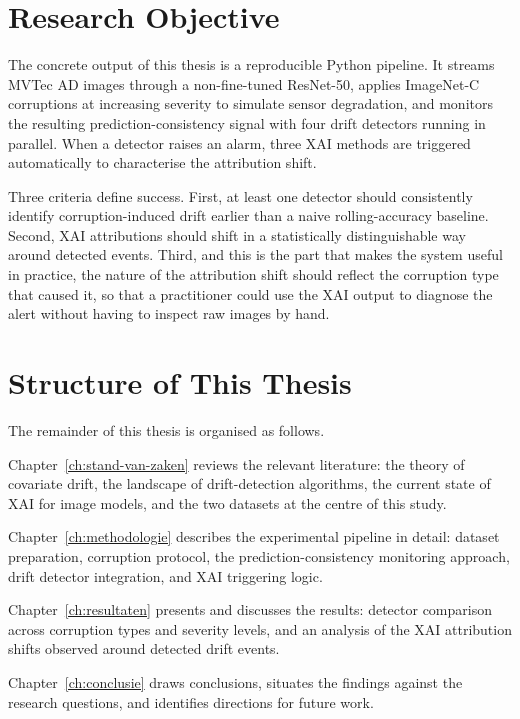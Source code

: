 \section{Research Objective}%
\label{sec:onderzoeksdoelstelling}

The concrete output of this thesis is a reproducible Python pipeline. It streams MVTec AD images through a non-fine-tuned ResNet-50, applies ImageNet-C corruptions at increasing severity to simulate sensor degradation, and monitors the resulting prediction-consistency signal with four drift detectors running in parallel. When a detector raises an alarm, three XAI methods are triggered automatically to characterise the attribution shift.

Three criteria define success. First, at least one detector should consistently identify corruption-induced drift earlier than a naive rolling-accuracy baseline. Second, XAI attributions should shift in a statistically distinguishable way around detected events. Third, and this is the part that makes the system useful in practice, the nature of the attribution shift should reflect the corruption type that caused it, so that a practitioner could use the XAI output to diagnose the alert without having to inspect raw images by hand.

\section{Structure of This Thesis}%
\label{sec:opzet-bachelorproef}

The remainder of this thesis is organised as follows.

Chapter~\ref{ch:stand-van-zaken} reviews the relevant literature: the theory of covariate drift, the landscape of drift-detection algorithms, the current state of XAI for image models, and the two datasets at the centre of this study.

Chapter~\ref{ch:methodologie} describes the experimental pipeline in detail: dataset preparation, corruption protocol, the prediction-consistency monitoring approach, drift detector integration, and XAI triggering logic.

Chapter~\ref{ch:resultaten} presents and discusses the results: detector comparison across corruption types and severity levels, and an analysis of the XAI attribution shifts observed around detected drift events.

Chapter~\ref{ch:conclusie} draws conclusions, situates the findings against the research questions, and identifies directions for future work.
